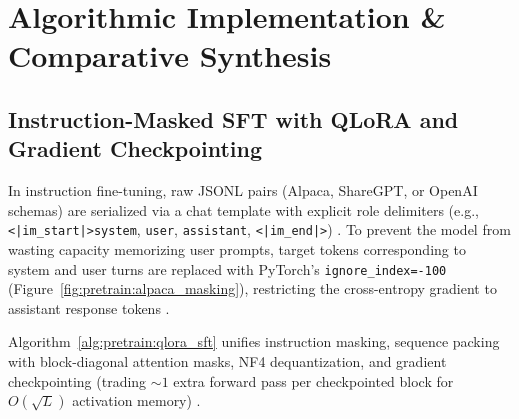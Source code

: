 \documentclass[../../../../master.tex]{subfiles}
\begin{document}
\section{Algorithmic Implementation \& Comparative Synthesis}
\label{sec:pretrain:algorithms}

\subsection{Instruction-Masked SFT with QLoRA and Gradient Checkpointing}
\label{sec:pretrain:sft_algo}

In instruction fine-tuning, raw JSONL pairs (Alpaca, ShareGPT, or OpenAI schemas) are serialized via a chat template with explicit role delimiters (e.g., \texttt{<|im\_start|>system}, \texttt{user}, \texttt{assistant}, \texttt{<|im\_end|>}) . To prevent the model from wasting capacity memorizing user prompts, target tokens corresponding to system and user turns are replaced with PyTorch's \texttt{ignore\_index=-100} (Figure~\ref{fig:pretrain:alpaca_masking}), restricting the cross-entropy gradient to assistant response tokens  .


Algorithm~\ref{alg:pretrain:qlora_sft} unifies instruction masking, sequence packing with block-diagonal attention masks, NF4 dequantization, and gradient checkpointing (trading $\sim 1$ extra forward pass per checkpointed block for $O(\sqrt{L})$ activation memory) .
\end{document}
